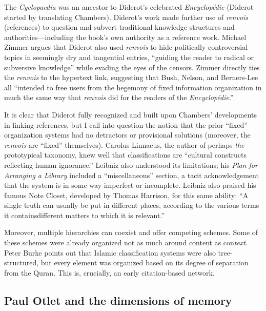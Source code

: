 The \emph{Cyclopaedia} was an ancestor to Diderot's celebrated \emph{Encyclop\'{e}die} (Diderot started by translating Chambers). Diderot's work made further use of \emph{renvois} (references) to question and subvert traditional knowledge structures and authorities---including the book's own authority as a reference work. Michael Zimmer argues that Diderot also used \emph{renvois} to hide politically controversial topics in seemingly dry and tangential entries, ``guiding the reader to radical or subversive knowledge'' while evading the eyes of the censors.\autocite[103]{zimmer_renvois_2009} Zimmer directly ties the \emph{renvois} to the hypertext link, suggesting that Bush, Nelson, and Berners-Lee all ``intended to free users from the hegemony of fixed information organization in much the same way that \emph{renvois} did for the readers of the \emph{Encyclop\'{e}die}.''\autocite[104]{zimmer_renvois_2009}

It is clear that Diderot fully recognized and built upon Chambers' developments in linking references, but I call into question the notion that the prior ``fixed'' organization systems had no detractors or provisional solutions (moreover, the \emph{renvois} are ``fixed'' themselves). Carolus Linnaeus, the author of perhaps \emph{the} prototypical taxonomy, knew well that classifications are ``cultural constructs reflecting human ignorance.''\autocite[99]{zimmer_renvois_2009} Leibniz also understood its limitations; his \emph{Plan for Arranging a Library} included a ``miscellaneous'' section, a tacit acknowledgement that the system is in some way imperfect or incomplete.\autocite{lost this cite, who is it? burke?} Leibniz also praised his famous Note Closet, developed by Thomas Harrison, for this same ability: ``A single truth can usually be put in different places, according to the various terms it contains\ldotsand different matters to which it is relevant.''\autocite[``Managing Abundant Notes'']{blair_too_2010} 

Moreover, multiple hierarchies can coexist and offer competing schemes. Some of these schemes were already organized not as much around content as con\emph{text}. Peter Burke points out that Islamic classification systems were also tree-structured, but every element was organized based on its degree of separation from the Quran.\autocite[94]{burke_social_2000} This is, crucially, an early citation-based network.

\subsection{Paul Otlet and the dimensions of memory}

